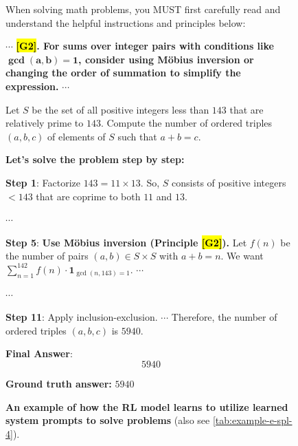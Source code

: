\documentclass{article}
\theoremstyle{plain}
\theoremstyle{definition}
\theoremstyle{remark}
\begin{document}
\begin{figure}[!tb]
\centering
\vspace{-2pt}
\caption{\textbf{An example of how the RL model learns to utilize learned system prompts to solve problems} (also see \autoref{tab:example-e-spl-4}).}

\begin{runcard}[title={Example of How E-SPL Shapes Model Behavior}]

\medskip

\begin{runbox}[title={\textbf{Learned System Prompt}}]
When solving math problems, you MUST first carefully read and understand the helpful instructions and principles below:

$\cdots$ \quad \textbf{\color{Brown}\hl{{[G2]}}. For sums over integer pairs with conditions like $\boldsymbol{\gcd(a,b)=1}$, consider using Möbius inversion or changing the order of summation to simplify the expression.} \quad $\cdots$

\end{runbox}

\begin{runbox}[title={Problem}]
Let $S$ be the set of all positive integers less than $143$ that are relatively prime to $143$. Compute the number of ordered triples $(a,b,c)$ of elements of $S$ such that $a+b=c$.

\end{runbox}

\begin{runbox}[title={Model Output}]

\textbf{Let's solve the problem step by step:}

\textbf{Step 1}: Factorize \( 143 = 11 \times 13 \). So, \( S \) consists of positive integers \( < 143 \) that are coprime to both $11$ and $13$.

\quad $\cdots$

\textbf{Step 5}: {\textbf{\color{Brown}Use Möbius inversion (Principle \hl{[G2]}).} Let \( f(n) \) be the number of pairs \( (a, b) \in S \times S \) with \( a + b = n \). We want \( \sum_{n=1}^{142} f(n) \cdot \mathbf{1}_{\gcd(n,143)=1} \). \quad $\cdots$}

\quad $\cdots$

\textbf{Step 11}: Apply inclusion-exclusion. \quad $\cdots$ \quad Therefore, the number of ordered triples $(a,b,c)$ is $5940$.

\textbf{Final Answer}:
\[
\boxed{5940}
\]

\end{runbox}

\textbf{Ground truth answer:} $5940$
\end{runcard}
\label{tab:example-e-spl-4-short}

\vspace{-6pt}
\end{figure}
\end{document}
